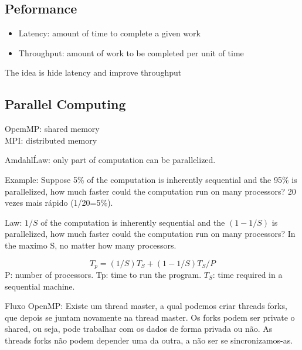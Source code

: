\subsection{Peformance}
\begin{itemize}
  \item Latency: amount of time to complete a given work
  \item Throughput: amount of work to be completed per unit of time
\end{itemize}

The idea is hide latency and improve throughput

\subsection{Parallel Computing}
OpemMP: shared memory \\
MPI: distributed memory 

Amdahl\' Law: only part of computation can be parallelized.

Example: Suppose 5\% of the computation is inherently sequential and the 95\% is parallelized,
how much faster could the computation run on many processors? 
20 vezes mais rápido (1/20=5\%). 

Law: $1/S$ of the computation is inherently sequential and the $(1-1/S)$ is parallelized, 
how much faster could the computation run on many processors? 
In the maximo S, no matter how many processors.

\begin{equation}
T_p = (1/S)T_S + (1-1/S)T_S/P 
\end{equation}
P: number of processors. 
Tp: time to run the program. 
$T_S$: time required in a sequential machine.

Fluxo OpenMP:
Existe um thread master, a qual podemos criar threads forks, que depois se juntam novamente
na thread master. Os forks podem ser private o shared, ou seja, pode trabalhar com os dados
de forma privada ou não. As threads forks não podem depender uma da outra, a não ser se 
sincronizamos-as.
